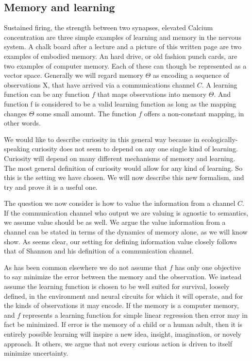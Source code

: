 \subsection{Memory and learning} 
Sustained firing, the strength between two synapses, elevated Calcium concentration are three simple examples of learning and memory in the nervous system. A chalk board after a lecture and a picture of this written page are two examples of embodied memory. An hard drive, or old fashion punch cards, are two examples of computer memory. Each of these can though be represented as a vector space. Generally we will regard memory $\Theta$ as encoding a sequence of observations X, that have arrived via a communications channel $C$. A learning function can be any function $f$ that maps observations into memory $\Theta$. And function f is considered to be a valid learning function as long as the mapping changes $\Theta$ some small amount. The function $f$ offers a non-constant mapping, in other words.

We would like to describe curiosity in this general way because in ecologically-speaking curiosity does not seem to depend on any one single kind of learning. Curiosity will depend on many different mechanisms of memory and learning. The most general definition of curiosity would allow for any kind of learning. So this is the setting we have chosen. We will now describe this new formalism, and try and prove it is a useful one.

The question we now consider is how to value the information from a channel $C$. If the communication channel who output we are valuing is agnostic to semantics, we assume value should be as well. We argue the value information from a channel can be stated in terms of the dynamics of memory alone, as we will know show. As seems clear, our setting for defining information value closely follows that of Shannon and his definition of a communication channel.

As has been common elsewhere \cite{Schmidhuber1991,Oudeyer2016,Pathak2017,Gottlieb2018,Wilson2020,Schwartenbeck2019} we do not assume that $f$ has only one objective to say minimize the error between the memory and the observation. We instead assume the learning function is chosen to be well suited for survival, loosely defined, in the environment and neural circuits for which it will operate, and for the kinds of observations it may encode. If the memory is a computer memory, and $f$ represents a learning function for simple linear regression then error may in fact be minimized. If error is the memory of a child or a human adult, then it is entirely possible learning will inspire a new idea, insight, imagination, or novely approach. It others, we argue that not every curious action is driven to itself minimize uncertainty.

